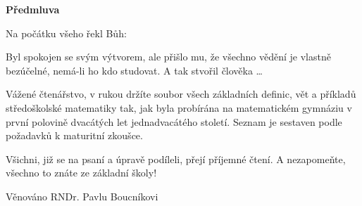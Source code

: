 
\clearpage
{}
{}
\begin{adjustwidth}{0.1\textwidth}{0.1\textwidth}
\begingroup
\null\vspace{0.2\textheight}
\begin{center}
{\bfseries\Large Předmluva}\par\vspace{2em}
\end{center}

Na počátku všeho řekl Bůh:
\begin{center}
\end{center}
Byl spokojen se svým výtvorem, ale přišlo mu, že všechno vědění je vlastně
bezúčelné, nemá-li ho kdo studovat. A tak stvořil člověka \dots

\par Vážené čtenářstvo, v rukou držíte soubor všech základních definic, vět
a příkladů středoškolské matematiky tak, jak byla probírána na matematickém gymnáziu
v první polovině dvacátých let jednadvacátého století. Seznam je sestaven podle
požadavků k maturitní zkoušce.
\par Všichni, již se na psaní a úpravě podíleli, přejí příjemné čtení. A nezapomeňte,
všechno to znáte ze základní školy!


\hfill Věnováno RNDr. Pavlu Boucníkovi
\endgroup
\end{adjustwidth}
\clearpage
